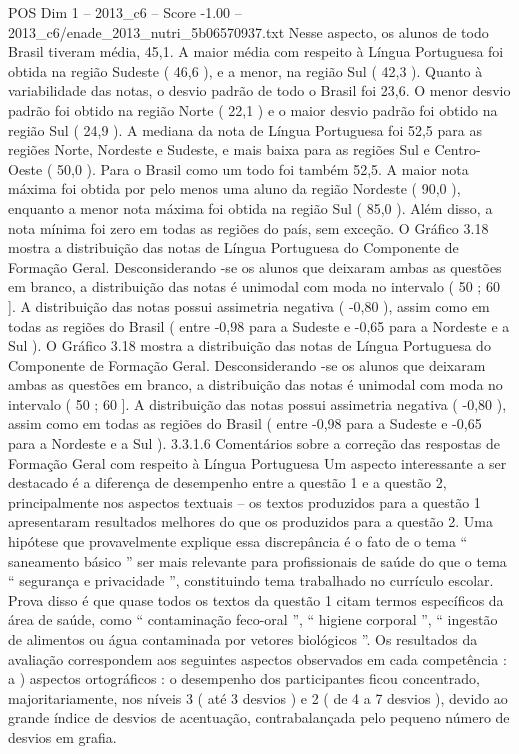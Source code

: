 \begin{textsample}{POS Dim 1 – 2013\_c6 – Score -1.00 – 2013\_c6/enade\_2013\_nutri\_5b06570937.txt}
Nesse aspecto, os alunos de todo Brasil tiveram média, 45,1.
A maior média com respeito à Língua Portuguesa foi obtida na região Sudeste ( 46,6 ), e a menor, na região Sul ( 42,3 ).
Quanto à variabilidade das notas, o desvio padrão de todo o Brasil foi 23,6.
O menor desvio padrão foi obtido na região Norte ( 22,1 ) e o maior desvio padrão foi obtido na região Sul ( 24,9 ).
A mediana da nota de Língua Portuguesa foi 52,5 para as regiões Norte, Nordeste e Sudeste, e mais baixa para as regiões Sul e Centro-Oeste ( 50,0 ).
Para o Brasil como um todo foi também 52,5.
A maior nota máxima foi obtida por pelo menos uma aluno da região Nordeste ( 90,0 ), enquanto a menor nota máxima foi obtida na região Sul ( 85,0 ).
Além disso, a nota mínima foi zero em todas as regiões do país, sem exceção.
O Gráfico 3.18 mostra a distribuição das notas de Língua Portuguesa do Componente de Formação Geral.
Desconsiderando -se os alunos que deixaram ambas as questões em branco, a distribuição das notas é unimodal com moda no intervalo ( 50 ; 60 ].
A distribuição das notas possui assimetria negativa ( -0,80 ), assim como em todas as regiões do Brasil ( entre -0,98 para a Sudeste e -0,65 para a Nordeste e a Sul ).
O Gráfico 3.18 mostra a distribuição das notas de Língua Portuguesa do Componente de Formação Geral.
Desconsiderando -se os alunos que deixaram ambas as questões em branco, a distribuição das notas é unimodal com moda no intervalo ( 50 ; 60 ].
A distribuição das notas possui assimetria negativa ( -0,80 ), assim como em todas as regiões do Brasil ( entre -0,98 para a Sudeste e -0,65 para a Nordeste e a Sul ). 3.3.1.6 Comentários sobre a correção das respostas de Formação Geral com respeito à Língua Portuguesa Um aspecto interessante a ser destacado é a diferença de desempenho entre a questão 1 e a questão 2, principalmente nos aspectos textuais – os textos produzidos para a questão 1 apresentaram resultados melhores do que os produzidos para a questão 2.
Uma hipótese que provavelmente explique essa discrepância é o fato de o tema “ saneamento básico ” ser mais relevante para profissionais de saúde do que o tema “ segurança e privacidade ”, constituindo tema trabalhado no currículo escolar.
Prova disso é que quase todos os textos da questão 1 citam termos específicos da área de saúde, como “ contaminação feco-oral ”, “ higiene corporal ”, “ ingestão de alimentos ou água contaminada por vetores biológicos ”.
Os resultados da avaliação correspondem aos seguintes aspectos observados em cada competência : a ) aspectos ortográficos : o desempenho dos participantes ficou concentrado, majoritariamente, nos níveis 3 ( até 3 desvios ) e 2 ( de 4 a 7 desvios ), devido ao grande índice de desvios de acentuação, contrabalançada pelo pequeno número de desvios em grafia.

\end{textsample}
